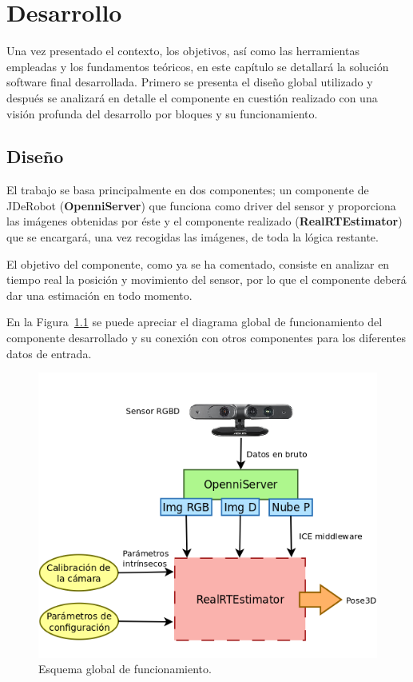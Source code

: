 
\chapter{Desarrollo}

\label{Chapter4} %

Una vez presentado el contexto, los objetivos, así como las herramientas empleadas y los fundamentos teóricos, en este capítulo se detallará la solución software final desarrollada. Primero se presenta el diseño global utilizado y después se analizará en detalle el componente en cuestión realizado con una visión profunda del desarrollo por bloques y su funcionamiento.


\section{Diseño}

El trabajo se basa principalmente en dos componentes; un componente de JDeRobot (\textbf{OpenniServer}) que funciona como driver del sensor y proporciona las imágenes obtenidas por éste y el componente realizado (\textbf{RealRTEstimator}) que se encargará, una vez recogidas las imágenes, de toda la lógica restante.

El objetivo del componente, como ya se ha comentado, consiste en analizar en tiempo real la posición y movimiento del sensor, por lo que el componente deberá dar una estimación en todo momento.

En la Figura~\ref{fig:diagram1} se puede apreciar el diagrama global de funcionamiento del componente desarrollado y su conexión con otros componentes para los diferentes datos de entrada.

\begin{figure}[th]
\centering
\includegraphics[scale=0.4]{Figures/diagram1.png}
\decoRule
\caption[Diagram1]{Esquema global de funcionamiento.}
\label{fig:diagram1}
\end{figure}

